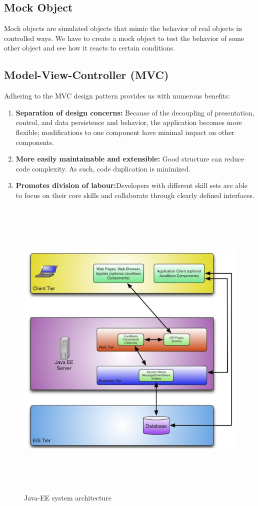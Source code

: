 \subsection {Mock Object}
Mock objects are simulated objects that mimic the behavior of real objects in controlled ways.
We have to create a mock object to test the behavior of some other object and see how it reacts
to certain conditions.

\subsection {Model-View-Controller (MVC)}

\begin{flushleft}

Adhering to the MVC design pattern provides us with numerous benefits:

\begin{enumerate}
	\item \textbf{Separation of design concerns:} Because of the decoupling of presentation, control, and data persistence and behavior, the application becomes more flexible; modifications to one component have minimal impact on other components.
	\item \textbf{More easily maintainable and extensible:} Good structure can reduce code complexity. As such, code duplication is minimized.
	\item \textbf{Promotes division of labour:}Developers with different skill sets are able to focus on their core skills and collaborate through clearly defined interfaces.
\end{enumerate}

	\begin{figure}[H]
		\centering\graphicspath{ {images/} }
		\includegraphics[width=\textwidth,height=15cm]{MVC.jpg}
	   	\caption{Java-EE system architecture}
	\end{figure}


\end{flushleft}
